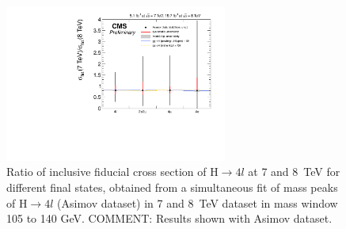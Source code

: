 \begin{figure}[!h!tb]
  \begin{center}
      \includegraphics[width=0.65\textwidth,angle=0]{Appendix/Plots/ratio7to8_mass4l_unfoldwith_SM_125.pdf}
    \caption{Ratio of inclusive fiducial cross section of H$\rightarrow 4l$ at 7 and 8~TeV for different final states, obtained
from a simultaneous fit of mass peaks of H$\rightarrow 4l$ (Asimov dataset) in 7 and 8~TeV dataset in mass window 105 to 140 GeV.
    COMMENT: Results shown with Asimov dataset.
} 
  \label{fig:inclusive-ratio7o8-asimov}
 \end{center}
\end{figure}




